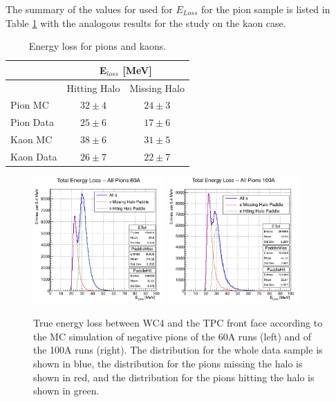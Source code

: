 The summary of the values for used for $E_{Loss}$ for the pion sample is listed in Table \ref{tab:Eloss}  with the analogous results for the study on the kaon case.

\begin{table}[b]
\centering
\begin{tabular}{|l|c|c|}  
\hline
                          &  \multicolumn{2}{c|}{E$_{loss}$ [MeV]}    \\ \hline
                          & Hitting Halo          & Missing Halo     \\ \hline
Pion  MC           &  $32 \pm 4 $         &    $24 \pm 3$     \\ \hline
Pion Data          &  $25 \pm 6$          &    $17 \pm 6 $    \\ \hline
Kaon  MC          &  $38 \pm 6 $        &     $31 \pm 5 $    \\ \hline
Kaon Data         &  $26 \pm 7 $        &     $22 \pm 7 $    \\ \hline
\end{tabular}
\caption{Energy loss for pions and kaons.}
\label{tab:Eloss}
\end{table}





\begin{figure}[hbpt]
\centering
\includegraphics[width=0.45\textwidth]{Chapter-5/Images/E_loss60A.png}
\includegraphics[width=0.45\textwidth]{Chapter-5/Images/E_loss100A.png}
\caption{True energy loss between WC4 and the TPC front face according to the MC simulation of negative pions of the 60A runs (left) and of the 100A runs (right). The distribution for the whole data sample is shown in blue, the distribution for the pions missing the halo is shown in red, and the distribution for the pions hitting the halo is shown in green.  }
\label{fig:ELoss60A}
\end{figure}

